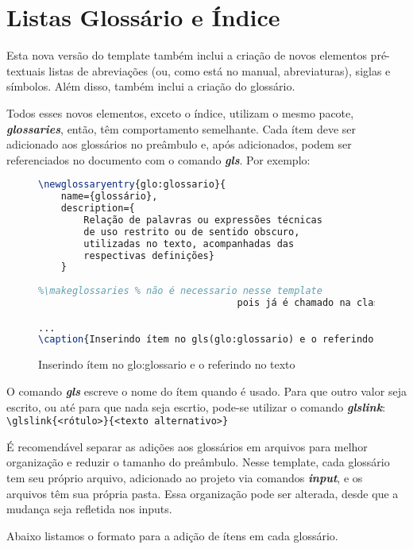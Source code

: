 \chapter{Listas Glossário e Índice}

Esta nova versão do template também inclui a criação de novos elementos pré-textuais listas de abreviações (ou, como está no manual, abreviaturas), siglas e símbolos. Além disso, também inclui a criação do glossário.

Todos esses novos elementos, exceto o índice, utilizam o mesmo pacote, \textit{\textbf{glossaries}}, então, têm comportamento semelhante. Cada ítem deve ser adicionado aos glossários no preâmbulo e, após adicionados, podem ser referenciados no documento com o comando \textit{\textbf{gls}}. Por exemplo:
	
\begin{figure}[!htb]
	\centering
	\caption{Inserindo ítem no \gls{glo:glossario} e o referindo no texto} %
	\begin{lstlisting}[language=tex]
\newglossaryentry{glo:glossario}{
	name={glossário}, 
	description={
		Relação de palavras ou expressões técnicas 
		de uso restrito ou de sentido obscuro, 
		utilizadas no texto, acompanhadas das 
		respectivas definições}
	}
		
%\makeglossaries % não é necessario nesse template
		                           pois já é chamado na classe

...
\caption{Inserindo ítem no gls(glo:glossario) e o referindo no texto}
	\end{lstlisting}
	\label{fig:exemploglossario1} %
\end{figure}

O comando \textit{\textbf{gls}} escreve o nome do ítem quando é usado. Para que outro valor seja escrito, ou até para que nada seja escrtio, pode-se utilizar o comando \textit{\textbf{glslink}}:\\
\verb|\glslink{<rótulo>}{<texto alternativo>}|

É recomendável separar as adições aos glossários em arquivos para melhor organização e reduzir o tamanho do preâmbulo. Nesse template, cada glossário tem seu próprio arquivo, adicionado ao projeto via comandos \textit{\textbf{input}}, e os arquivos têm sua própria pasta. Essa organização pode ser alterada, desde que a mudança seja refletida nos inputs.

\newpage
Abaixo listamos o formato para a adição de ítens em cada glossário. 

